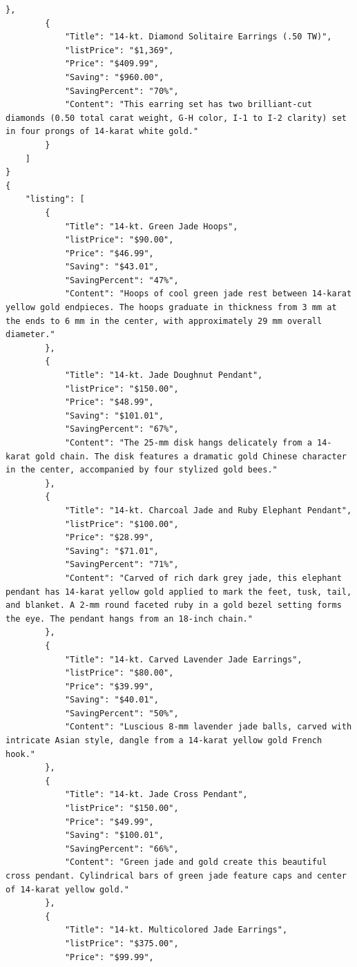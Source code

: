 \documentclass[runningheads]{llncs}
\begin{document}
\begin{lstlisting}[caption={Results for jewlary website},captionpos=b, label={lst:label2}]
        },
        {
            "Title": "14-kt. Diamond Solitaire Earrings (.50 TW)",
            "listPrice": "$1,369",
            "Price": "$409.99",
            "Saving": "$960.00",
            "SavingPercent": "70%",
            "Content": "This earring set has two brilliant-cut diamonds (0.50 total carat weight, G-H color, I-1 to I-2 clarity) set in four prongs of 14-karat white gold."
        }
    ]
}
{
    "listing": [
        {
            "Title": "14-kt. Green Jade Hoops",
            "listPrice": "$90.00",
            "Price": "$46.99",
            "Saving": "$43.01",
            "SavingPercent": "47%",
            "Content": "Hoops of cool green jade rest between 14-karat yellow gold endpieces. The hoops graduate in thickness from 3 mm at the ends to 6 mm in the center, with approximately 29 mm overall diameter."
        },
        {
            "Title": "14-kt. Jade Doughnut Pendant",
            "listPrice": "$150.00",
            "Price": "$48.99",
            "Saving": "$101.01",
            "SavingPercent": "67%",
            "Content": "The 25-mm disk hangs delicately from a 14-karat gold chain. The disk features a dramatic gold Chinese character in the center, accompanied by four stylized gold bees."
        },
        {
            "Title": "14-kt. Charcoal Jade and Ruby Elephant Pendant",
            "listPrice": "$100.00",
            "Price": "$28.99",
            "Saving": "$71.01",
            "SavingPercent": "71%",
            "Content": "Carved of rich dark grey jade, this elephant pendant has 14-karat yellow gold applied to mark the feet, tusk, tail, and blanket. A 2-mm round faceted ruby in a gold bezel setting forms the eye. The pendant hangs from an 18-inch chain."
        },
        {
            "Title": "14-kt. Carved Lavender Jade Earrings",
            "listPrice": "$80.00",
            "Price": "$39.99",
            "Saving": "$40.01",
            "SavingPercent": "50%",
            "Content": "Luscious 8-mm lavender jade balls, carved with intricate Asian style, dangle from a 14-karat yellow gold French hook."
        },
        {
            "Title": "14-kt. Jade Cross Pendant",
            "listPrice": "$150.00",
            "Price": "$49.99",
            "Saving": "$100.01",
            "SavingPercent": "66%",
            "Content": "Green jade and gold create this beautiful cross pendant. Cylindrical bars of green jade feature caps and center of 14-karat yellow gold."
        },
        {
            "Title": "14-kt. Multicolored Jade Earrings",
            "listPrice": "$375.00",
            "Price": "$99.99",

\end{lstlisting}
\end{document}
